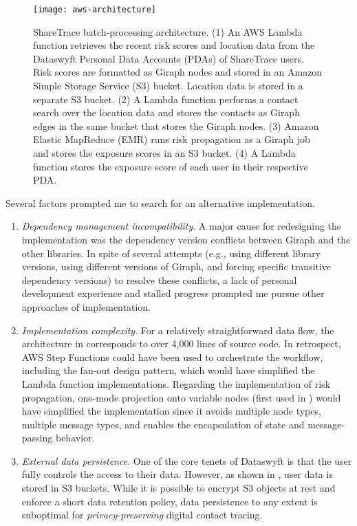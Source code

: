 \begin{figure}[htbp]
\centering
\texttt{[image: aws-architecture]}
\caption[ShareTrace batch-processing architecture]{ShareTrace batch-processing architecture. (1) An AWS Lambda function retrieves the recent risk scores and location data from the Dataswyft Personal Data Accounts (PDAs) of ShareTrace users. Risk scores are formatted as Giraph nodes and stored in an Amazon Simple Storage Service (S3) bucket. Location data is stored in a separate S3 bucket. (2) A Lambda function performs a contact search over the location data and stores the contacts as Giraph edges in the same bucket that stores the Giraph nodes. (3) Amazon Elastic MapReduce (EMR) runs risk propagation as a Giraph job and stores the exposure scores in an S3 bucket. (4) A Lambda function stores the exposure score of each user in their respective PDA.}
\label{fig:aws-architecture}
\end{figure}

Several factors prompted me to search for an alternative implementation.

\begin{enumerate}
  \item \emph{Dependency management incompatibility}. A major cause for redesigning the implementation was the dependency version conflicts between Giraph and the other libraries. In spite of several attempts (e.g., using different library versions, using different versions of Giraph, and forcing specific transitive dependency versions) to resolve these conflicts, a lack of personal development experience and stalled progress prompted me pursue other approaches of implementation.
  \item \emph{Implementation complexity}. For a relatively straightforward data flow, the architecture in  corresponds to over 4,000 lines of source code. In retrospect, AWS Step Functions could have been used to orchestrate the workflow, including the fan-out design pattern, which would have simplified the Lambda function implementations. Regarding the implementation of risk propagation, one-mode projection onto variable nodes (first used in ) would have simplified the implementation since it avoids multiple node types, multiple message types, and enables the encapsulation of state and message-passing behavior.
  \item \emph{External data persistence}. One of the core tenets of Dataswyft is that the user fully controls the access to their data. However, as shown in , user data is stored in S3 buckets. While it is possible to encrypt S3 objects at rest and enforce a short data retention policy, data persistence to any extent is suboptimal for \emph{privacy-preserving} digital contact tracing.
\end{enumerate}

